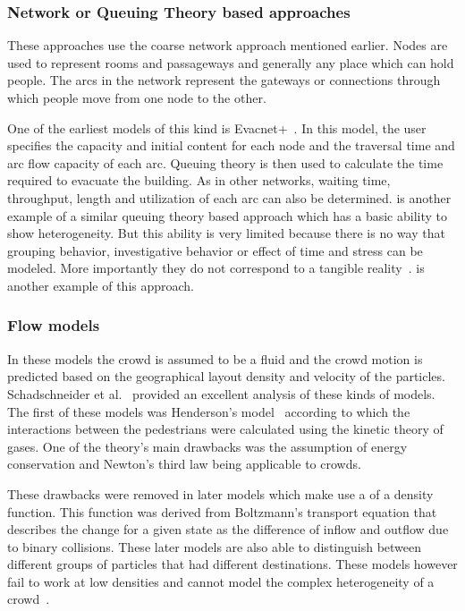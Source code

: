 \subsubsection{Network or Queuing Theory based approaches}

These approaches use the coarse network approach mentioned earlier. Nodes are used to represent rooms and passageways and generally any place which can hold people. The arcs in the network represent the gateways or connections through which people move from one node to the other.

One of the earliest models of this kind is Evacnet+~\cite{kisko1985evacnet+}. In this model, the user specifies the capacity and initial content for each node and the traversal time and arc flow capacity of each arc. Queuing theory is then used to calculate the time required to evacuate the building. As in other networks, waiting time, throughput, length and utilization of each arc can also be determined. \cite{Lammel:2009dj} is another example of a similar queuing theory based approach which has a basic ability to show heterogeneity. But this ability is very limited because there is no way that grouping behavior, investigative behavior or effect of time and stress can be modeled. More importantly they do not correspond to a tangible reality~\cite{Bierlaire:2003uj}. \cite{Lino:2009td} is another example of this approach.

\subsubsection{Flow models}

In these models the crowd is assumed to be a fluid and the crowd motion is predicted based on the geographical layout density and velocity of the particles. Schadschneider et al.~\cite{Schadschneider:2008cz} provided an excellent analysis of these kinds of models. The first of these models was Henderson's model~\cite{Henderson:1974ve} according to which the interactions between the pedestrians were calculated using the kinetic theory of gases. One of the theory's main drawbacks was the assumption of energy conservation and Newton's third law being applicable to crowds.

These drawbacks were removed in later models which make use a of a density function. This function was derived from Boltzmann's transport equation that describes the change for a given state as the difference of inflow and outflow due to binary collisions. These later models are also able to distinguish between different groups of particles that had different destinations. These models however fail to work at low densities and cannot model the complex heterogeneity of a crowd~\cite{Bierlaire:2003uj}.


